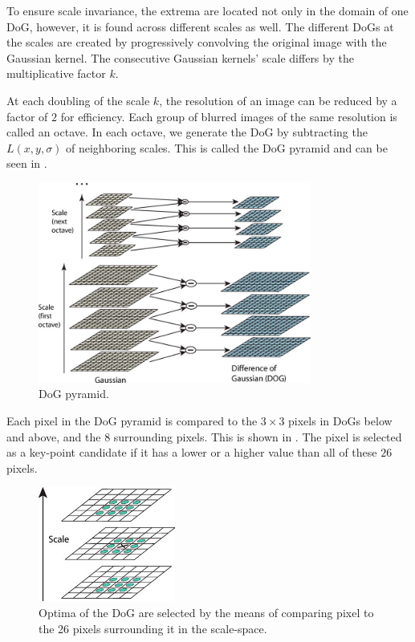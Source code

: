To ensure scale invariance, the extrema are located not only in the domain of one DoG, however, it is found across different scales as well. The different DoGs at the scales are created by progressively convolving the original image with the Gaussian kernel. The consecutive Gaussian kernels' scale differs by the multiplicative factor $k$.

At each doubling of the scale $k$, the resolution of an image can be reduced by a factor of $2$ for efficiency. Each group of blurred images of the same resolution is called an octave. In each octave, we generate the DoG by subtracting the $L(x, y, \sigma)$ of neighboring scales. This is called the DoG pyramid and can be seen in .

\begin{figure}
    \centering
    \includegraphics[width=0.8\textwidth]{Figures/sift/pyramid.jpg}
    \caption[DoG pyramid.]{DoG pyramid. \cite{Lowe2004}}
    \label{fig:DoG_pyramid}
\end{figure}

Each pixel in the DoG pyramid is compared to the $3\times3$ pixels in DoGs below and above, and the $8$ surrounding pixels. This is shown in . The pixel is selected as a key-point candidate if it has a lower or a higher value than all of these $26$ pixels.

\begin{figure}
    \centering
    \includegraphics[width=0.4\textwidth]{Figures/sift/extrema.jpg}
    \caption[Optima of the DoG are selected by the means of comparing pixel to the 26 pixels surrounding it in the scale-space.]{Optima of the DoG are selected by the means of comparing pixel to the 26 pixels surrounding it in the scale-space. \cite{Lowe2004}}
    \label{fig:DoG_extrema}
\end{figure}

